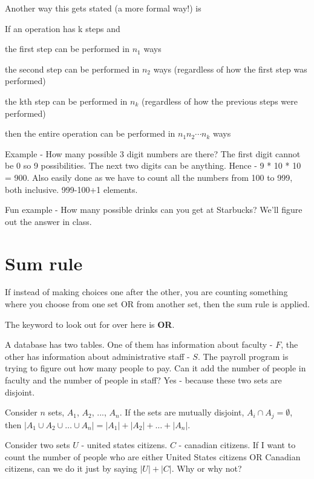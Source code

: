 \documentclass[12pt]{article}
\begin{document}
\vspace{0.7cm}
Another way this gets stated (a more formal way!) is

If an operation has k steps and 

the first step can be performed in $n_1$ ways

the second step can be performed in $n_2$ ways (regardless of how the first step was performed)

the kth step can be performed in $n_k$ (regardless of how the previous steps were performed)

then the entire operation can be performed in $n_1n_2 \cdots n_k$ ways

\vspace{0.7cm}

Example - How many possible 3 digit numbers are there? 
The first digit cannot be 0 so 9 possibilities. The next two digits can be anything. Hence - 
9 * 10 * 10 = 900. Also easily done as we have to count all the numbers from 100 to 999, both inclusive. 999-100+1 elements.

Fun example - How many possible drinks can you get at Starbucks? We'll figure out the answer in class. 

\section*{Sum rule}

If instead of making choices one after the other, you are counting something where you choose from one set OR from another set, then the sum rule is applied.

The keyword to look out for over here is \textbf{OR}.

A database has two tables. One of them has information about faculty - $F$, the other has information about administrative staff - $S$. The payroll program is trying to figure out how many people to pay. Can it add the number of people in faculty and the number of people in staff? Yes - because these two sets are disjoint. 

Consider $n$ sets, $A_1$, $A_2$, ..., $A_n$. If the sets are mutually disjoint, $A_i \cap A_j = \emptyset$, then 
$|A_1 \cup A_2 \cup \ldots \cup A_n| = |A_1| + |A_2| + \ldots + |A_n|$. 

\medskip

Consider two sets $U$ - united states citizens. $C$ - canadian citizens. If I want to count the number of people who are either United States citizens OR Canadian citizens, can we do it just by saying $|U| + |C|$. Why or why not?
\end{document}
